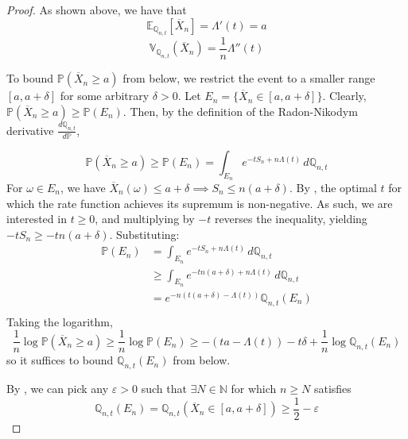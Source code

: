 \documentclass{article}
\newcommand{\E}{\mathbb{E}}
\renewcommand{\P}{\mathbb{P}}
\newcommand{\Q}{\mathbb{Q}}
\newcommand{\N}{\mathbb{N}}
\newcommand{\Var}{\mathbb{V}}
\begin{document}
\begin{proof}
  As shown above, we have that
  \begin{equation}
    \E_{\Q_{n,t}}[\overline{X}_n] = \Lambda'(t) = a
  \end{equation}
  \begin{equation}
    \Var_{\Q_{n,t}}(\overline{X}_n) = \frac{1}{n}\Lambda''(t)
  \end{equation}

  To bound $\P(\overline{X}_n \ge a)$ from below, we restrict the event to a smaller range $[a, a+\delta]$ for some arbitrary $\delta > 0$. Let $E_n = \{ \overline{X}_n \in [a, a+\delta] \}$. Clearly, $\P(\overline{X}_n \ge a) \ge \P(E_n)$. Then, by the definition of the Radon-Nikodym derivative
  $\frac{d\Q_{n,t}}{d\P}$,

  \begin{equation}
    \P(\overline{X}_n \ge a) \ge \P(E_n) = \int_{E_n} e^{-t S_n + n\Lambda(t)} \, d\Q_{n,t}
  \end{equation}
  For $\omega \in E_n$, we have $\overline{X}_n(\omega) \le a + \delta \implies S_n \le n(a+\delta)$.
  By , the optimal $t$ for which the rate function achieves its supremum is non-negative. As such, we are interested in $t\ge 0$, and multiplying by $-t$
  reverses the inequality, yielding $-t S_n \ge -tn(a+\delta)$. Substituting:
  \begin{equation}
    \begin{aligned}
      \P(E_n) &= \int_{E_n} e^{-t S_n + n\Lambda(t)} \, d\Q_{n,t}\\
      &\ge \int_{E_n} e^{-tn(a+\delta) + n\Lambda(t)} \, d\Q_{n,t}\\
      &= e^{-n(t(a+\delta) - \Lambda(t))} \Q_{n,t}(E_n)\\
    \end{aligned}
  \end{equation}
  Taking the logarithm,
  \begin{equation}
    \frac{1}{n} \log \P(\overline{X}_n \ge a) \ge \frac{1}{n} \log \P(E_n) \ge -(ta - \Lambda(t)) - t\delta + \frac{1}{n} \log \Q_{n,t}(E_n)
  \end{equation}
  so it suffices to bound $\Q_{n,t}(E_n)$ from below.

  By , we can pick any $\varepsilon > 0$ such that $\exists N \in \N$ for which
  $n \ge N$ satisfies
  \begin{equation}
    \Q_{n,t}(E_n) = \Q_{n,t}\left(\overline{X}_n \in [a, a+\delta]\right) \ge \frac{1}{2} - \varepsilon
  \end{equation}


\end{proof}
\end{document}
